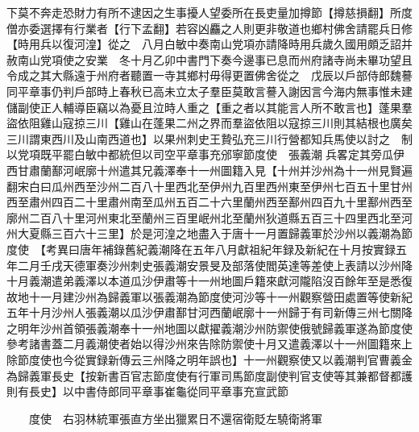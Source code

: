 下莫不奔走恐財力有所不逮因之生事擾人望委所在長吏量加撙節【撙慈損翻】所度僧亦委選擇有行業者【行下孟翻】若容凶麤之人則更非敬道也鄉村佛舍請罷兵日修【時用兵以復河湟】從之　八月白敏中奏南山党項亦請降時用兵歲久國用頗乏詔并赦南山党項使之安業　冬十月乙卯中書門下奏今邊事已息而州府諸寺尚未畢功望且令成之其大縣遠于州府者聽置一寺其鄉村毋得更置佛舍從之　戊辰以戶部侍郎魏謩同平章事仍判戶部時上春秋已高未立太子羣臣莫敢言謩入謝因言今海内無事惟未建儲副使正人輔導臣竊以為憂且泣時人重之【重之者以其能言人所不敢言也】蓬果羣盜依阻雞山寇掠三川【雞山在蓬果二州之界而羣盜依阻以寇掠三川則其結根也廣矣三川謂東西川及山南西道也】以果州刺史王贄弘充三川行營都知兵馬使以討之　制以党項既平罷白敏中都統但以司空平章事充邠寧節度使　張義潮兵畧定其旁瓜伊西甘肅蘭鄯河岷廓十州遣其兄義澤奉十一州圖籍入見【十州并沙州為十一州見賢遍翻宋白曰瓜州西至沙州二百八十里西北至伊州九百里西州東至伊州七百五十里甘州西至肅州四百二十里肅州南至瓜州五百二十六里蘭州西至鄯州四百九十里鄯州西至廓州二百八十里河州東北至蘭州三百里岷州北至蘭州狄道縣五百三十四里西北至河州大夏縣三百六十三里】於是河湟之地盡入于唐十一月置歸義軍於沙州以義潮為節度使　【考異曰唐年補錄舊紀義潮降在五年八月獻祖紀年録及新紀在十月按實録五年二月壬戌天德軍奏沙州刺史張義潮安景旻及部落使閻英達等差使上表請以沙州降十月義潮遣弟義澤以本道瓜沙伊肅等十一州地圖戶籍來獻河隴陷沒百餘年至是悉復故地十一月建沙州為歸義軍以張義潮為節度使河沙等十一州觀察營田處置等使新紀五年十月沙州人張義潮以瓜沙伊肅鄯甘河西蘭岷廓十一州歸于有司新傳三州七關降之明年沙州首領張義潮奉十一州地圖以獻擢義潮沙州防禦使俄號歸義軍遂為節度使參考諸書蓋二月義潮使者始以得沙州來告除防禦使十月又遣義澤以十一州圖籍來上除節度使也今從實録新傳云三州降之明年誤也】十一州觀察使又以義潮判官曹義金為歸義軍長史【按新書百官志節度使有行軍司馬節度副使判官支使等其兼都督都護則有長史】以中書侍郎同平章事崔龜從同平章事充宣武節

　　度使　右羽林統軍張直方坐出獵累日不還宿衛貶左驍衛將軍

